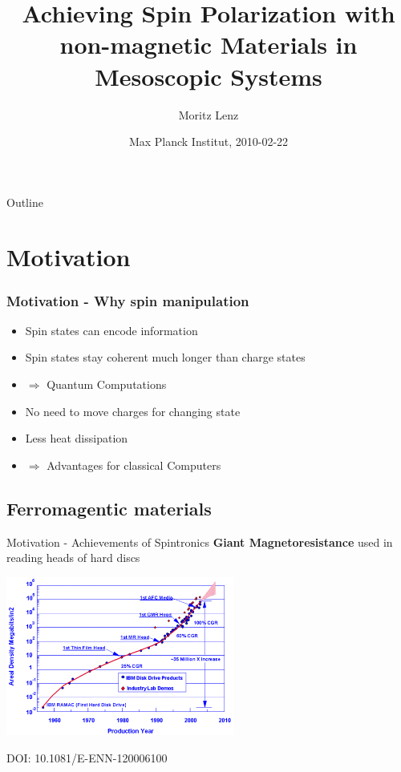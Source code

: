 \documentclass{beamer}
\title{Achieving Spin Polarization with non-magnetic Materials in Mesoscopic
Systems}
\author{Moritz Lenz}
\institute{Institut für Theoretische Physik und Astrophysik, Universität
Würzburg}
\date{Max Planck Institut, 2010-02-22}
\begin{document}
\begin{frame}
  \titlepage

%

\end{frame}

\begin{frame}{Outline}
    \tableofcontents
\end{frame}

\section{Motivation}

\begin{frame}
    \frametitle{Motivation - Why spin manipulation}

	\begin{itemize}
		\item Spin states can encode information
		\item Spin states stay coherent much longer than charge states
        \item $\Rightarrow$ Quantum Computations
            \pause
        \item No need to move charges for changing state
        \item Less heat dissipation
        \item $\Rightarrow$ Advantages for classical Computers
	\end{itemize}

\end{frame}

\subsection{Ferromagentic materials}

\begin{frame}{Motivation - Achievements of Spintronics}
        \textbf{Giant Magnetoresistance} used in reading heads of hard discs

    \includegraphics[width=75mm]{storage-density.png}

    \footnotesize DOI: 10.1081/E-ENN-120006100
\end{frame}
\end{document}
